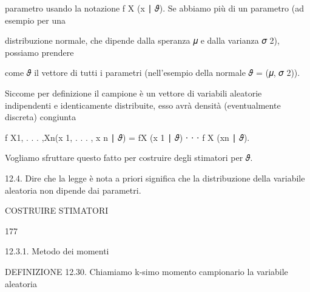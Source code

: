 \documentclass[a4paper,portrait,12pt]{article}
\begin{document}
\begin{flushleft}
parametro usando la notazione f X (x ∣ 𝜗). Se abbiamo più di un parametro (ad esempio per una
\end{flushleft}


\begin{flushleft}
distribuzione normale, che dipende dalla speranza 𝜇 e dalla varianza 𝜎 2), possiamo prendere
\end{flushleft}


\begin{flushleft}
come 𝜗 il vettore di tutti i parametri (nell'esempio della normale 𝜗 = (𝜇, 𝜎 2)).
\end{flushleft}


\begin{flushleft}
Siccome per definizione il campione \`{e} un vettore di variabili aleatorie indipendenti e identicamente distribuite, esso avr\`{a} densit\`{a} (eventualmente discreta) congiunta
\end{flushleft}


\begin{flushleft}
f X1, . . . ,Xn(x 1, . . . , x n ∣ 𝜗) = fX (x 1 ∣ 𝜗) ⋅ ⋅ ⋅ f X (xn ∣ 𝜗).
\end{flushleft}


\begin{flushleft}
Vogliamo sfruttare questo fatto per costruire degli stimatori per 𝜗.
\end{flushleft}


\begin{flushleft}
12.4. Dire che la legge \`{e} nota a priori significa che la distribuzione della variabile aleatoria non dipende dai parametri.
\end{flushleft}





\begin{flushleft}
 COSTRUIRE STIMATORI
\end{flushleft}





177





\begin{flushleft}
12.3.1. Metodo dei momenti
\end{flushleft}


\begin{flushleft}
DEFINIZIONE 12.30. Chiamiamo k-simo momento campionario la variabile aleatoria
\end{flushleft}
\end{document}

